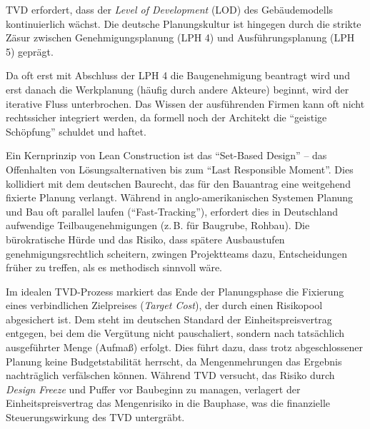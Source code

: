\acs{TVD} erfordert, dass der \textit{Level of Development} (LOD) des Gebäudemodells kontinuierlich wächst. Die deutsche Planungskultur ist hingegen durch die strikte Zäsur zwischen Genehmigungsplanung (\acs{LPH} 4) und Ausführungsplanung (\acs{LPH} 5) geprägt.\autocite[Vgl.][§~33 i.\,V.\,m.~Anl.~10]{hoai_honorarordnung_2021}

Da oft erst mit Abschluss der \acs{LPH} 4 die Baugenehmigung beantragt wird und erst danach die Werkplanung (häufig durch andere Akteure) beginnt, wird der iterative Fluss unterbrochen. Das Wissen der ausführenden Firmen kann oft nicht rechtssicher integriert werden, da formell noch der Architekt die \enquote{geistige Schöpfung} schuldet und haftet. \autocite[Vgl.][§~650p]{noauthor_burgerliches_1900}

Ein Kernprinzip von Lean Construction ist das \enquote{Set-Based Design} – das Offenhalten von Lösungsalternativen bis zum \enquote{Last Responsible Moment}. Dies kollidiert mit dem deutschen Baurecht, das für den Bauantrag eine weitgehend fixierte Planung verlangt.
Während in anglo-amerikanischen Systemen Planung und Bau oft parallel laufen (\enquote{Fast-Tracking}), erfordert dies in Deutschland aufwendige Teilbaugenehmigungen (z.\,B. für Baugrube, Rohbau). Die bürokratische Hürde und das Risiko, dass spätere Ausbaustufen genehmigungsrechtlich scheitern, zwingen Projektteams dazu, Entscheidungen früher zu treffen, als es methodisch sinnvoll wäre. \autocite[Vgl.][S.~92]{girmscheid_projektabwicklung_2016}


Im idealen \acs{TVD}-Prozess markiert das Ende der Planungsphase die Fixierung eines verbindlichen Zielpreises (\textit{Target Cost}), der durch einen Risikopool abgesichert ist.
Dem steht im deutschen Standard der Einheitspreisvertrag entgegen, bei dem die Vergütung nicht pauschaliert, sondern nach tatsächlich ausgeführter Menge (Aufmaß) erfolgt. Dies führt dazu, dass trotz abgeschlossener Planung keine Budgetstabilität herrscht, da Mengenmehrungen das Ergebnis nachträglich verfälschen können. Während \acs{TVD} versucht, das Risiko durch \textit{Design Freeze} und Puffer vor Baubeginn zu managen, verlagert der Einheitspreisvertrag das Mengenrisiko in die Bauphase, was die finanzielle Steuerungswirkung des \acs{TVD} untergräbt.\autocite[Vgl.][S.~2]{kochendorfer_vobb_2010}








